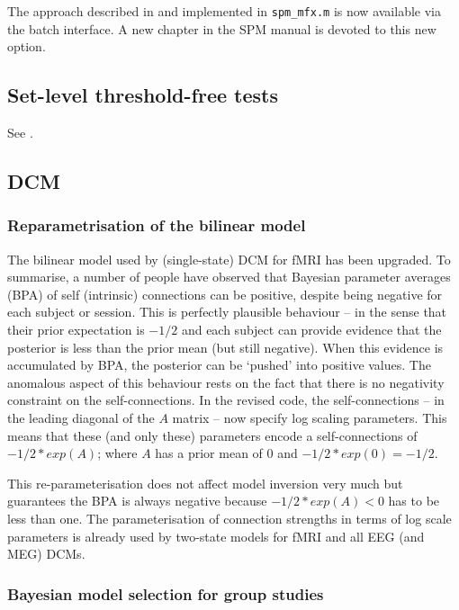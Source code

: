 \documentclass[a4paper,titlepage,openany]{article}
\begin{document}
The approach described in \cite{karl_mixed} and implemented in \texttt{spm\_mfx.m} is now available via the batch interface. A new chapter in the SPM manual is devoted to this new option.

\subsection{Set-level threshold-free tests}

See \cite{Barnes2013}.

\subsection{DCM}

\subsubsection{Reparametrisation of the bilinear model}

The bilinear model used by (single-state) DCM for fMRI has been upgraded. To summarise, a number of people have observed that Bayesian parameter averages (BPA) of self (intrinsic) connections can be positive, despite being negative for each subject or session. This is perfectly plausible behaviour -- in the sense that their prior expectation is $-1/2$ and each subject can provide evidence that the posterior is less than the prior mean (but still negative). When this evidence is accumulated by BPA, the posterior can be `pushed' into positive values. The anomalous aspect of this behaviour rests on the fact that there is no negativity constraint on the self-connections.  In the revised code, the self-connections -- in the leading diagonal of the $A$ matrix -- now specify log scaling parameters. This means that these (and only these) parameters encode a self-connections of $-1/2*exp(A)$; where $A$ has a prior mean of $0$ and $-1/2*exp(0) = -1/2$.

This re-parameterisation does not affect model inversion very much but guarantees the BPA is always negative because $-1/2*exp(A) < 0$ has to be less than one. The parameterisation of connection strengths in terms of log scale parameters is already used by two-state models for fMRI and all EEG (and MEG) DCMs.

\subsubsection{Bayesian model selection for group studies}
\end{document}
